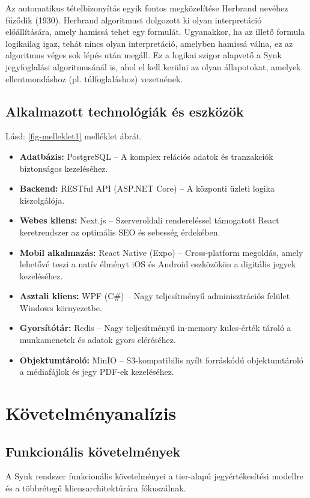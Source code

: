 \documentclass[colorlinks]{docs}
\theoremstyle{definition}
\theoremstyle{remark}
\begin{document}
Az automatikus tételbizonyítás egyik fontos megközelítése Herbrand nevéhez fűződik (1930). Herbrand algoritmust dolgozott ki olyan interpretáció előállítására, amely hamissá tehet egy formulát. Ugyanakkor, ha az illető formula logikailag igaz, tehát nincs olyan interpretáció, amelyben hamissá válna, ez az algoritmus véges sok lépés után megáll. {\cite{Varteresz}} Ez a logikai szigor alapvető a Synk jegyfoglalási algoritmusánál is, ahol el kell kerülni az olyan állapotokat, amelyek ellentmondáshoz (pl. túlfoglaláshoz) vezetnének.

\section{Alkalmazott technológiák és eszközök}
Lásd: \ref{fig-melleklet1} melléklet ábrát.

\begin{itemize}
	\item \textbf{Adatbázis:} PostgreSQL \cite{postgresql} – A komplex relációs adatok és tranzakciók biztonságos kezeléséhez.
	\item \textbf{Backend:} RESTful API (ASP.NET Core) \cite{dotnet10} – A központi üzleti logika kiszolgálója.
	\item \textbf{Webes kliens:} Next.js \cite{nextjs} – Szerveroldali rendereléssel támogatott React keretrendszer az optimális SEO és sebesség érdekében.
	\item \textbf{Mobil alkalmazás:} React Native (Expo) \cite{reactnative} – Cross-platform megoldás, amely lehetővé teszi a natív élményt iOS és Android eszközökön a digitális jegyek kezeléséhez.
	\item \textbf{Asztali kliens:} WPF (C\#) \cite{gossman2005} – Nagy teljesítményű adminisztrációs felület Windows környezetbe.
	\item \textbf{Gyorsítótár:} Redis \cite{redis} – Nagy teljesítményű in-memory kulcs-érték tároló a munkamenetek és adatok gyors eléréséhez.
	\item \textbf{Objektumtároló:} MinIO \cite{minio} – S3-kompatibilis nyílt forráskódú objektumtároló a médiafájlok és jegy PDF-ek kezeléséhez.
\end{itemize}

\chapter{Követelményanalízis}

\section{Funkcionális követelmények}
A Synk rendszer funkcionális követelményei a tier-alapú jegyértékesítési modellre és a többrétegű kliensarchitektúrára fókuszálnak.
\end{document}
